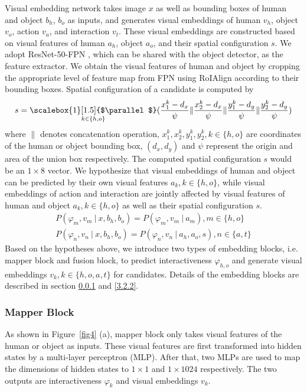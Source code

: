 \documentclass[sigconf,screen]{acmart}
\DeclareMathOperator*{\concat}{\scalebox{1}[1.5]{$\parallel$}}
\begin{document}
Visual embedding network takes image $x$ as well as bounding boxes of human and object $b_h$, $b_o$ as inputs, and generates visual embeddings of human $v_h$, object $v_o$, action $v_a$, and interaction $v_t$. These visual embeddings are constructed based on visual features of human $a_h$, object $a_o$, and their spatial configuration $s$. We adopt ResNet-50-FPN \cite{he2016deep,lin2017feature}, which can be shared with the object detector, as the feature extractor. We obtain the visual features of human and object by cropping the appropriate level of feature map from FPN using RoIAlign \cite{he2017mask} according to their bounding boxes. Spatial configuration of a candidate is computed by
\begin{gather}
s = \concat_{k \in \{h, o\}} (\frac{x^k_1 - d_x}{\psi} \| \frac{x^k_2 - d_x}{\psi} \| \frac{y^k_1 - d_y}{\psi} \| \frac{y^k_2 - d_y}{\psi})
\end{gather}
where $\|$ denotes concatenation operation, $x^k_1, x^k_2, y^k_1, y^k_2, k \in \{h, o\}$ are coordinates of the human or object bounding box, $(d_x, d_y)$ and $\psi$ represent the origin and area of the union box respectively. The computed spatial configuration $s$ would be an $1 \times 8$ vector. We hypothesize that visual embeddings of human and object can be predicted by their own visual features $a_k, k \in \{h, o\}$, while visual embeddings of action and interaction are jointly affected by visual features of human and object $a_k, k \in \{h, o\}$ as well as their spatial configuration $s$.
\begin{gather}
P(\varphi_m, v_m\ |\ x, b_h, b_o) = P(\varphi_m, v_m\ |\ a_m), m \in \{h, o\}\\
P(\varphi_n, v_n\ |\ x, b_h, b_o) = P(\varphi_n, v_n\ |\ a_h, a_o, s), n \in \{a, t\}
\end{gather}
Based on the hypotheses above, we introduce two types of embedding blocks, i.e. mapper block and fusion block, to predict interactiveness $\varphi_{h, o}$ and generate visual embeddings $v_k, k \in \{h, o, a, t\}$ for candidates. Details of the embedding blocks are described in section \ref{3.2.1} and \ref{3.2.2}.

\subsubsection{Mapper Block}\label{3.2.1}

As shown in Figure~\ref{fig4} (a), mapper block only takes visual features of the human or object as inputs. These visual features are first transformed into hidden states by a multi-layer perceptron (MLP). After that, two MLPs are used to map the dimensions of hidden states to $1 \times 1$ and $1 \times 1024$ respectively. The two outputs are interactiveness $\varphi_k$ and visual embeddings $v_k$.
\end{document}
